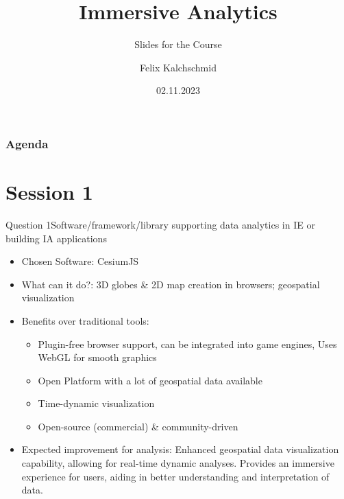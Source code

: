 \documentclass[t,aspectratio=169,divpsnames]{beamer}
\title{Immersive Analytics}
\subtitle{Slides for the Course}
\author{Felix Kalchschmid}
\institute{Universität Konstanz}
\date{02.11.2023}
\begin{document}
\begin{frame}
\titlepage
\end{frame}

\begin{frame}
\frametitle{Agenda}
\tableofcontents
\end{frame}

\section{Session 1}
\begin{frame}{Question 1}{Software/framework/library supporting data analytics in IE or building IA applications}
\begin{itemize}
    \item Chosen Software: CesiumJS
    \item What can it do?: 3D globes \& 2D map creation in browsers; geospatial visualization
    \item Benefits over traditional tools: 
    \begin{itemize}
        \item Plugin-free browser support, can be integrated into game engines, Uses WebGL for smooth graphics
        \item Open Platform with a lot of geospatial data available
        \item Time-dynamic visualization
        \item Open-source (commercial) \& community-driven
    \end{itemize}
    \item Expected improvement for analysis: Enhanced geospatial data visualization capability, allowing for real-time dynamic analyses. Provides an immersive experience for users, aiding in better understanding and interpretation of data.

\end{itemize}
\end{frame}
\end{document}

